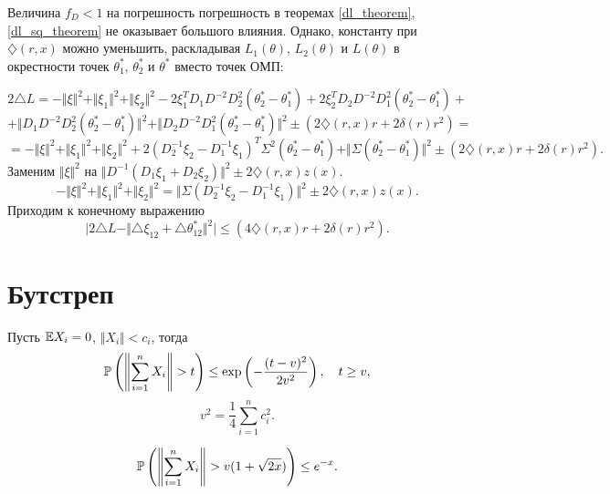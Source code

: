 \begin{remark}
Величина $f_D < 1$ на погрешность погрешность в теоремах \ref{dl_theorem},
\ref{dl_sq_theorem} не оказывает большого влияния. Однако, константу при $\diamondsuit (r, x)$ можно уменьшить,  раскладывая $L_1(\theta)$, $L_2(\theta)$ и $L(\theta)$ в окрестности точек  $\theta_1^*$, $\theta_2^*$ и $\theta^*$ вместо точек ОМП:

\[
2 \triangle L = - \Vert \xi \Vert^2 + \Vert \xi_1 \Vert^2 + \Vert \xi_2 \Vert^2   - 
2 \xi_1^T D_1 D^{-2} D_2^2 (\theta_2^* - \theta_1^*) + 2 \xi_2^T D_2 D^{-2} D_1^2 (\theta_2^* - \theta_1^*)+
\]
\[ + \Vert  D_1 D^{-2} D_2^2 (\theta_2^* - \theta_1^* )\Vert^2 + \Vert  D_2 D^{-2} D_1^2 (\theta_2^* - \theta_1^*) \Vert^2 \pm (2 \diamondsuit (r, x) r + 2 \delta(r) r^2) =
\]
\[
= - \Vert \xi \Vert^2 + \Vert \xi_1 \Vert^2 + \Vert \xi_2 \Vert^2   + 
2(D_2^{-1} \xi_2 - D_1^{-1} \xi_1)^T \Sigma^2 (\theta_2^* - \theta_1^*) + 
\Vert \Sigma (\theta_2^* - \theta_1^*) \Vert^2 \pm (2 \diamondsuit (r, x) r + 2 \delta(r) r^2).
\]
Заменим $\Vert \xi \Vert^2$ на $\Vert D^{-1}(D_1 \xi_1 + D_2 \xi_2) \Vert^2 \pm  2\diamondsuit (r, x) z(x) $. 
\[
- \Vert \xi \Vert^2 + \Vert \xi_1 \Vert^2 + \Vert \xi_2 \Vert^2  = \Vert \Sigma (D_2^{-1} \xi_2 - D_1^{-1} \xi_1) \Vert^2 \pm  2\diamondsuit (r, x) z(x).
\]
Приходим к конечному выражению
\[
\bigg |
2 \triangle L  -  \Vert \triangle \xi_{12} + \triangle \theta_{12}^* \Vert^2 
\bigg | 
\leq (4 \diamondsuit (r, x) r + 2 \delta(r) r^2).
\]
\end{remark}
    
 

\section{Бутстреп}

\begin{lemma}
Пусть $\mathrm{{\mathbb E}} X_i = 0$, $\Vert X_i \Vert < c_i$, тогда 
\[
\mathrm{{\mathbb P}}\left(\left\Vert \sum_{i=1}^{n} X_i \right\Vert > t \right) \leq \text{exp} \left( - \frac{(t - v)^2}{2v^2} \right), 
\quad t \geq v,
\]
\[
v^2 = \frac{1}{4} \sum_{i=1}^{n} c_i^2.
\]
\end{lemma}


\begin{suite}
\[
\mathrm{{\mathbb P}}\left(\left\Vert \sum_{i=1}^{n} X_i \right\Vert > v (1 + \sqrt{2x}) \right) \leq e^{-x}.
\]
\end{suite}


